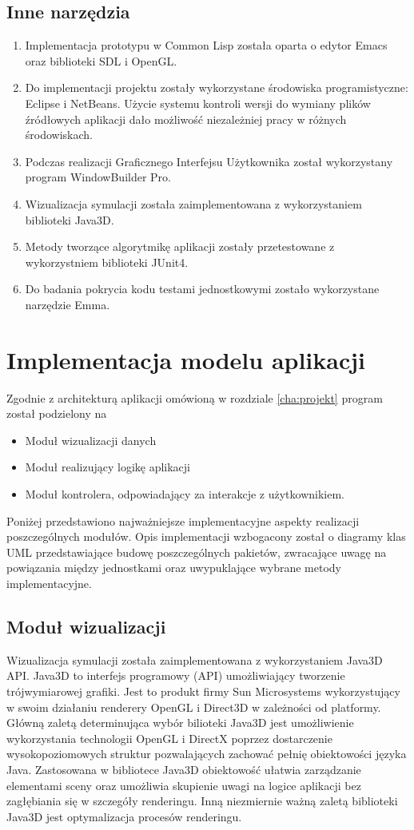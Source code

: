 \subsection{Inne narzędzia}
\begin{enumerate}
\item Implementacja prototypu w Common Lisp została oparta o edytor Emacs oraz biblioteki SDL i OpenGL.
\item Do implementacji projektu zostały wykorzystane środowiska programistyczne: Eclipse i NetBeans. Użycie systemu kontroli wersji do wymiany plików źródłowych aplikacji dało możliwość niezależniej pracy w różnych środowiskach.
\item Podczas realizacji Graficznego Interfejsu Użytkownika został wykorzystany program WindowBuilder Pro.
\item Wizualizacja symulacji została zaimplementowana z wykorzystaniem biblioteki Java3D.
\item Metody tworzące algorytmikę aplikacji zostały przetestowane z wykorzystniem biblioteki JUnit4.
\item Do badania pokrycia kodu testami jednostkowymi zostało wykorzystane narzędzie Emma.
\end{enumerate}


\section {Implementacja modelu aplikacji}
Zgodnie z architekturą aplikacji omówioną w rozdziale \ref{cha:projekt} program został podzielony na 
\begin{itemize}
\item Moduł wizualizacji danych
\item Moduł realizujący logikę aplikacji
\item Moduł kontrolera, odpowiadający za interakcje z użytkownikiem.
\end{itemize}
Poniżej przedstawiono najważniejsze implementacyjne aspekty realizacji poszczególnych modułów.
Opis implementacji wzbogacony został o diagramy klas UML przedstawiające budowę poszczególnych pakietów, zwracające uwagę na powiązania między jednostkami oraz uwypuklające wybrane metody implementacyjne.
\subsection {Moduł wizualizacji}
Wizualizacja symulacji została zaimplementowana z wykorzystaniem Java3D API.
Java3D to interfejs programowy (API) umożliwiający tworzenie trójwymiarowej grafiki. Jest to produkt firmy Sun Microsystems wykorzystujący w swoim działaniu renderery OpenGL i Direct3D w zależności od platformy.
Główną zaletą determinująca wybór bilioteki Java3D jest umożliwienie wykorzystania technologii OpenGL i DirectX poprzez dostarczenie wysokopoziomowych struktur pozwalających zachować pełnię obiektowości języka Java. 
Zastosowana w bibliotece Java3D obiektowość ułatwia zarządzanie elementami sceny oraz umożliwia skupienie uwagi na logice aplikacji bez zagłębiania się w szczegóły renderingu. Inną niezmiernie ważną zaletą biblioteki Java3D jest optymalizacja procesów renderingu.
